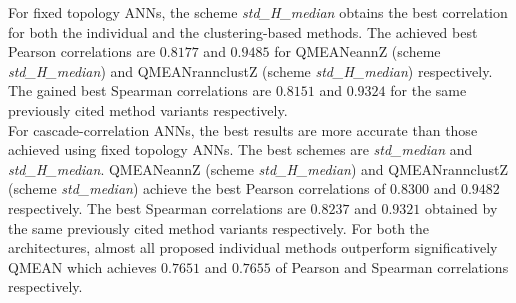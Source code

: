 For fixed topology ANNs, the scheme \emph{std\_H\_median} obtains the best correlation for both the individual and the clustering-based methods. The achieved best Pearson correlations are $0.8177$ and $0.9485$ for QMEANeannZ (scheme \emph{std\_H\_median}) and QMEANrannclustZ (scheme \emph{std\_H\_median}) respectively. The gained best Spearman correlations are $0.8151$ and $0.9324$ for the same previously cited method variants respectively.\\
For ca\-sca\-de-\-cor\-re\-la\-tion ANNs, the best results are more accurate than those achieved using fixed topology ANNs. The best schemes are \emph{std\_median} and \emph{std\_H\_median}. QMEANeannZ (scheme \emph{std\_H\_median}) and QMEANrannclustZ (scheme \emph{std\_median}) achieve the best Pearson correlations of $0.8300$ and $0.9482$ respectively. The best Spearman correlations are $0.8237$ and $0.9321$ obtained by the same previously cited method variants respectively. 
For both the architectures, almost all proposed individual methods outperform significatively QMEAN which achieves $0.7651$ and $0.7655$ of Pearson and Spearman correlations respectively.



